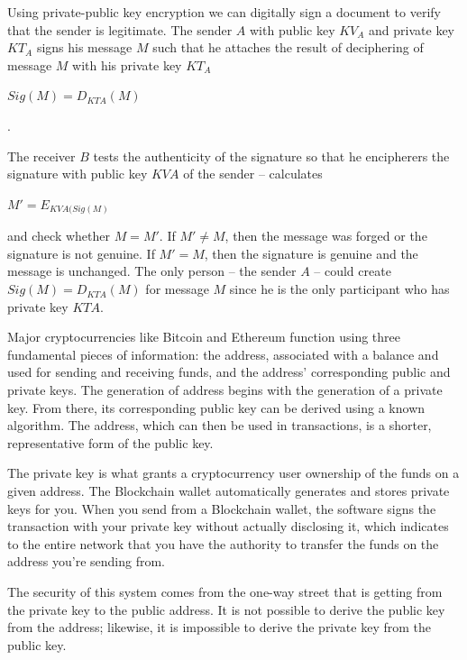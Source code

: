Using private-public key encryption we can digitally sign a document to verify that the sender is legitimate. The sender $A$ with public key $KV_A$ and private key $KT_A$ signs his message $M$ such that he attaches the result of deciphering of message $M$ with his private key $KT_A$ 

\begin{center}
    $Sig(M) =D_{KTA}(M)$
\end{center}.

The receiver $B$ tests the authenticity of the signature so that he encipherers the signature with public key $KVA$ of the sender – calculates
\begin{center}
    $M'=E_{KVA(Sig(M)}$
\end{center}

and check whether $M = M'$. If $M' \neq M$, then the message was forged or the signature is not genuine. If $M' = M$, then the signature is genuine and the message is unchanged. The only person – the sender $A$ – could create $Sig(M) = D_{KTA}(M)$ for message $M$ since he is the only participant who has private key $KTA$. \cite{OneWayHashFunctions}

Major cryptocurrencies like Bitcoin and Ethereum function using three fundamental pieces of information: the address, associated with a balance and used for sending and receiving funds, and the address’ corresponding public and private keys. The generation of address begins with the generation of a private key. From there, its corresponding public key can be derived using a known algorithm. The address, which can then be used in transactions, is a shorter, representative form of the public key.

The private key is what grants a cryptocurrency user ownership of the funds on a given address. The Blockchain wallet automatically generates and stores private keys for you. When you send from a Blockchain wallet, the software signs the transaction with your private key without actually disclosing it, which indicates to the entire network that you have the authority to transfer the funds on the address you’re sending from.

The security of this system comes from the one-way street that is getting from the private key to the public address. It is not possible to derive the public key from the address; likewise, it is impossible to derive the private key from the public key. 